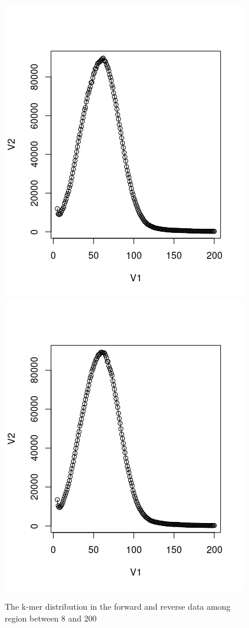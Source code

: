 \documentclass{article}
\begin{document}
\begin{figure}[h]
	\centering
	\includegraphics[scale=0.5 ]{peak1} 
	\includegraphics[scale=0.5 ]{peak2} \\
	
	\centering \caption{The k-mer distribution in the forward and reverse data among region between 8 and 200}
	\label{saw}
\end{figure}
\end{document}
